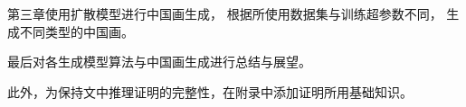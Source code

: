 第三章使用扩散模型进行中国画生成，
根据所使用数据集与训练超参数不同，
生成不同类型的中国画。

最后对各生成模型算法与中国画生成进行总结与展望。

此外，为保持文中推理证明的完整性，在附录中添加证明所用基础知识。

